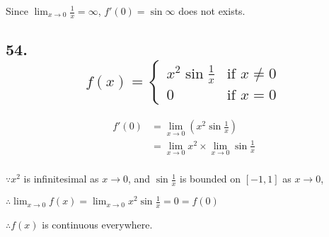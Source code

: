 \documentclass{article}
\begin{document}
    Since $\lim_{x \to 0}\frac 1 x = \infty$, $f'(0) = \sin \infty$ does not exists.

    \subsection*{54. $$f(x) = \left\{ \begin{array}{ll}
        x^2\sin\frac 1 x & \textrm{if $x \not = 0$} \\
        0 & \textrm{if $x = 0$}
    \end{array} \right.$$}

    $$
    \begin{aligned}
        f'(0) &= \lim_{x \to 0}(x^2\sin \frac 1 x) \\
        &= \lim_{x \to 0}x^2 \times \lim_{x \to 0}\sin \frac 1 x \\
    \end{aligned}
    $$

    $\because x^2$ is infinitesimal as $x \to 0$, and $\sin \frac 1 x$ is bounded on $[-1,1]$ as $x \to 0$,

    $\therefore \lim_{x \to 0}f(x) = \lim_{x \to 0}x^2\sin \frac 1 x = 0 = f(0)$

    $\therefore f(x)$ is continuous everywhere.
\end{document}
